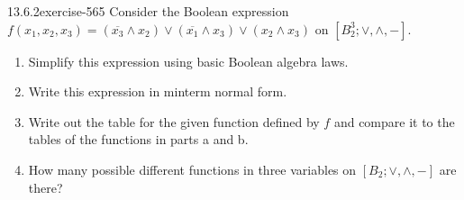 \documentclass[twoside,10pt,]{book}
\numberwithin{equation}{section}
\begin{document}
\begin{divisionsolution}{13.6.2}{}{exercise-565}%
\hypertarget{p-5030}{}%
Consider the Boolean expression \(f\left(x_1, x_2, x_3\right)=\left(\overline{x_3}\land x_2\right)\lor\left(\overline{x_1}\land x_3\right)\lor
\left(x_2\land x_3\right)\) on \(\left[B_2^3; \lor, \land, - \right].\)\leavevmode%
\begin{enumerate}[label=(\alph*)]
\item\hypertarget{li-2282}{}\hypertarget{p-5031}{}%
Simplify this expression using basic Boolean algebra laws.%
\item\hypertarget{li-2283}{}\hypertarget{p-5032}{}%
Write this expression in minterm normal form.%
\item\hypertarget{li-2284}{}\hypertarget{p-5033}{}%
Write out the table for the given function defined by \(f\) and compare it to the tables of the functions in parts a and b.%
\item\hypertarget{li-2285}{}\hypertarget{p-5034}{}%
How many possible different functions in three variables on \(\left[B_2; \lor, \land, - \right]\) are there?%
\end{enumerate}
%
\end{divisionsolution}%
\end{document}
